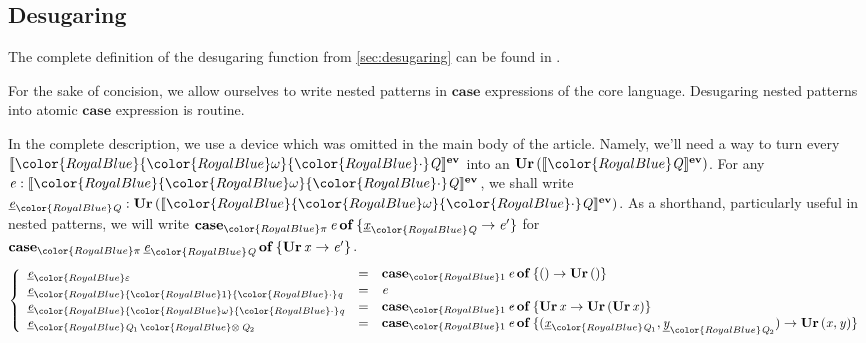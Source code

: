 \documentclass[acmsmall,usenames,dvipsnames,natbib=false,acmthm=false,screen]{acmart}
\newcommand{\constraintcolour}{\color{RoyalBlue}}
\newcommand{\constraintfont}[1]{{\constraintcolour#1}}
\newcommand{\multiplicitycolour}{\color{RoyalBlue}}
\newcommand{\multiplicityfont}[1]{{\multiplicitycolour#1}}
\newcommand{\scale}{\constraintfont{\cdot}}
\newcommand{\constraintop}[1]{\mathop{\constraintfont{#1}}}
\newcommand{\qtensor}{\constraintop{\otimes}}
\newcommand{\dsevidence}[1]{\llbracket #1 \rrbracket^{\mathbf{ev}}}
\newcommand{\keyword}[1]{\mathbf{#1}}
\newcommand{\kcase}{\keyword{case}}
\theoremstyle{acmplain}
\theoremstyle{acmdefinition}
\begin{document}
\subsection{Desugaring}
\label{sec:appendix:desugaring}

The complete definition of the desugaring function from
\cref{sec:desugaring} can be found in
.

For the sake of concision, we allow ourselves to write nested patterns
in $\kcase$ expressions of the core language. Desugaring nested patterns
into atomic $\kcase$ expression is routine.

In the complete description, we use a device which was omitted in the
main body of the article. Namely, we'll need a way to turn every
$  \dsevidence{\constraintfont{   \multiplicityfont{ \omega }  \scale \ottnt{Q}  } }  $ into an $ \ottkw{Ur} \, \ottsym{(}   \dsevidence{\constraintfont{ \ottnt{Q} } }   \ottsym{)} $. For any
$\ottnt{e}  \ottsym{:}   \dsevidence{\constraintfont{   \multiplicityfont{ \omega }  \scale \ottnt{Q}  } } $, we shall write $ \underline{ \ottnt{e} }_{  \constraintfont{ \ottnt{Q} }  }   \ottsym{:}  \ottkw{Ur} \, \ottsym{(}   \dsevidence{\constraintfont{   \multiplicityfont{ \omega }  \scale \ottnt{Q}  } }   \ottsym{)}$. As a shorthand, particularly useful in nested
patterns, we will write $  \kcase_  \multiplicityfont{ \pi }   \, \ottnt{e} \, \ottkw{of} \, \ottsym{\{}   \underline{ \ottmv{x} }_{  \constraintfont{ \ottnt{Q} }  }   \to  \ottnt{e'}  \ottsym{\}} $ for
$  \kcase_  \multiplicityfont{ \pi }   \,  \underline{ \ottnt{e} }_{  \constraintfont{ \ottnt{Q} }  }  \, \ottkw{of} \, \ottsym{\{}  \ottkw{Ur} \, \ottmv{x}  \to  \ottnt{e'}  \ottsym{\}} $.
%
$$
\left\{
  \begin{array}{lcl}
      \underline{ \ottnt{e} }_{  \constraintfont{  \mathbf{\varepsilon}  }  }  & = &   \kcase_  \multiplicityfont{ \ottsym{1} }   \, \ottnt{e} \, \ottkw{of} \, \ottsym{\{}  \ottsym{()}  \to  \ottkw{Ur} \, \ottsym{()}  \ottsym{\}}  \\
      \underline{ \ottnt{e} }_{  \constraintfont{   \multiplicityfont{ \ottsym{1} }  \scale \ottnt{q}  }  }   & = &  \ottnt{e}  \\
      \underline{ \ottnt{e} }_{  \constraintfont{   \multiplicityfont{ \omega }  \scale \ottnt{q}  }  }   & = &   \kcase_  \multiplicityfont{ \ottsym{1} }   \, \ottnt{e} \, \ottkw{of} \, \ottsym{\{}  \ottkw{Ur} \, \ottmv{x}  \to  \ottkw{Ur} \, \ottsym{(}  \ottkw{Ur} \, \ottmv{x}  \ottsym{)}  \ottsym{\}}  \\
      \underline{ \ottnt{e} }_{  \constraintfont{ \ottnt{Q_{{\mathrm{1}}}}  \qtensor  \ottnt{Q_{{\mathrm{2}}}} }  }   & = &   \kcase_  \multiplicityfont{ \ottsym{1} }   \, \ottnt{e} \, \ottkw{of} \, \ottsym{\{}  \ottsym{(}   \underline{ \ottmv{x} }_{  \constraintfont{ \ottnt{Q_{{\mathrm{1}}}} }  }   \ottsym{,}   \underline{ \ottmv{y} }_{  \constraintfont{ \ottnt{Q_{{\mathrm{2}}}} }  }   \ottsym{)}  \to  \ottkw{Ur} \, \ottsym{(}  \ottmv{x}  \ottsym{,}  \ottmv{y}  \ottsym{)}  \ottsym{\}} 
  \end{array}
\right.
$$
\end{document}
